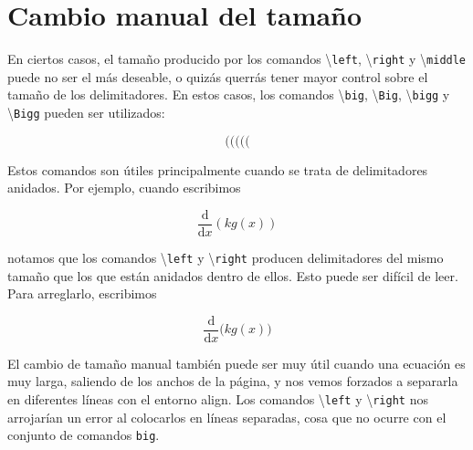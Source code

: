 \documentclass[12pt,letterpaper]{article}
\begin{document}
\section{Cambio manual del tamaño}

En ciertos casos, el tamaño producido por los comandos \textbackslash\texttt{left}, \textbackslash\texttt{right} y \textbackslash\texttt{middle} puede no ser el más deseable, o quizás querrás tener mayor control sobre el tamaño de los delimitadores. En estos casos, los comandos \textbackslash \texttt{big}, \textbackslash \texttt{Big}, \textbackslash\texttt{bigg} y \textbackslash \texttt{Bigg} pueden ser utilizados:

\begin{displaymath}
( \big( \Big( \bigg( \Bigg(
\end{displaymath}

Estos comandos son útiles principalmente cuando se trata de delimitadores anidados. Por ejemplo, cuando escribimos


\begin{displaymath}
\frac{\mathrm d}{\mathrm d x} \left( k g(x) \right)
\end{displaymath}

notamos que los comandos \textbackslash\texttt{left} y \textbackslash\texttt{right} producen delimitadores del mismo tamaño que los que están anidados dentro de ellos. Esto puede ser difícil de leer. Para arreglarlo, escribimos

\begin{displaymath}
\frac{\mathrm d}{\mathrm d x} \Big( k g(x) \Big)
\end{displaymath}

El cambio de tamaño manual también puede ser muy útil cuando una ecuación es muy larga, saliendo de los anchos de la página, y nos vemos forzados a separarla en diferentes líneas con el entorno align. Los comandos \textbackslash\texttt{left} y \textbackslash\texttt{right} nos arrojarían un error al colocarlos en líneas separadas, cosa que no ocurre con el conjunto de comandos \texttt{big}.
\end{document}
